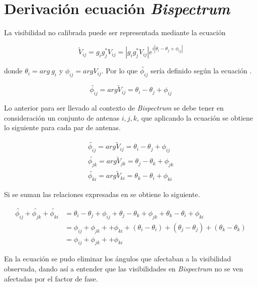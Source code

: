 \chapter{Derivación ecuación \textit{Bispectrum}}
\label{finales:anexo1}

La visibilidad no calibrada puede ser representada mediante la ecuación 

\begin{equation}
    \tilde{V}_{ij} = g_{i}g_{j}^{*}V_{ij} = |g_{i}g_{j}^{*}V_{ij}|e^{i|\theta_{i} - \theta_{j} + \phi_{ij}|}
    \label{equation:vis_corr}
\end{equation}

donde $\theta_{i} = arg\ g_{i}$ y $\phi_{ij} = arg V_{ij}$. Por lo que $\tilde{\phi_{ij}}$ sería definido según la ecuación  \citep{Chael_2018}.

\begin{equation}
    \tilde{\phi_{ij}} = arg \tilde{V}_{ij} = \theta_{i} - \theta_{j} + \phi_{ij}
    \label{equation:phi_anex}
\end{equation}

Lo anterior para ser llevado al contexto de \textit{Bispectrum} se debe tener en consideración un conjunto de antenas $i,j,k$, que aplicando la ecuación  se obtiene lo siguiente para cada par de antenas. 

\begin{equation}
  \label{eq:all_phi}
  \begin{aligned}
    \tilde{\phi_{ij}} = arg \tilde{V}_{ij} = \theta_{i} - \theta_{j} + \phi_{ij}\\        
    \tilde{\phi_{jk}} = arg \tilde{V}_{jk} = \theta_{j} - \theta_{k} + \phi_{jk}\\
    \tilde{\phi_{ki}} = arg \tilde{V}_{ki} = \theta_{k} - \theta_{i} + \phi_{ki}
  \end{aligned}
\end{equation}

Si se suman las relaciones expresadas en  se obtiene lo siguiente.

\begin{equation}
  \label{eq:phi_clear}
  \begin{split}
    \tilde{\phi_{ij}}+\tilde{\phi_{jk}}+\tilde{\phi_{ki}} &=  \theta_{i} - \theta_{j} + \phi_{ij} + \theta_{j} - \theta_{k} + \phi_{jk} + \theta_{k} - \theta_{i} + \phi_{ki} \\
    & = \phi_{ij} + \phi_{jk} + + \phi_{ki} + (\theta_{i} - \theta_{i}) + (\theta_{j} - \theta_{j}) + (\theta_{k} - \theta_{k})\\
    &= \phi_{ij} + \phi_{jk} + + \phi_{ki}
  \end{split}
\end{equation}

En la ecuación  se pudo eliminar los ángulos que afectaban a la visibilidad observada, dando así a entender que las visibilidades en \textit{Bispectrum} no se ven afectadas por el factor de fase. 
